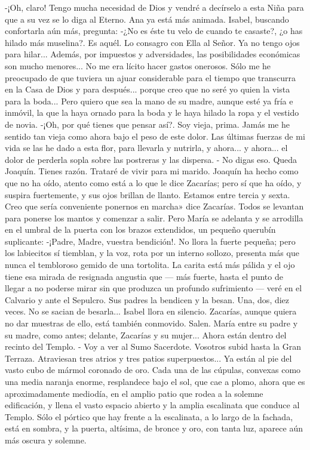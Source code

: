 \documentclass[12pt]{book} %
\begin{document}
-¡Oh, claro! Tengo mucha necesidad de Dios y vendré a decírselo a esta Niña para que a su vez se lo diga al Eterno. 
Ana ya está más animada. Isabel, buscando confortarla aún más, pregunta: 
-¿No es éste tu velo de cuando te casaste?, ¿o has hilado más muselina?. 
Es aquél. Lo consagro con Ella al Señor. Ya no tengo ojos para hilar... Además, por impuestos y adversidades, las posibilidades económicas son mucho menores... No me era lícito hacer gastos onerosos. Sólo me he preocupado de que tuviera un ajuar considerable para el tiempo que transcurra en la Casa de Dios y para después... porque creo que no seré yo quien la vista para la boda... Pero quiero que sea la mano de su madre, aunque esté ya fría e inmóvil, la que la haya ornado para la boda y le haya hilado la ropa y el vestido de novia. 
-¡Oh, por qué tienes que pensar así?. 
Soy vieja, prima. Jamás me he sentido tan vieja como ahora bajo el peso de este dolor. Las últimas fuerzas de mi vida 
se las he dado a esta flor, para llevarla y nutrirla, y ahora... y ahora... el dolor de perderla sopla sobre las postreras y las dispersa. - No digas eso. Queda Joaquín. 
Tienes razón. Trataré de vivir para mi marido. 
Joaquín ha hecho como que no ha oído, atento como está a lo que le dice Zacarías; pero sí que ha oído, y suspira 
fuertemente, y sus ojos brillan de llanto. 
Estamos entre tercia y sexta. Creo que sería conveniente ponernos en marcha» dice Zacarías. 
Todos se levantan para ponerse los mantos y comenzar a salir. 
Pero María se adelanta y se arrodilla en el umbral de la puerta con los brazos extendidos, un pequeño querubín 
suplicante: 
-¡Padre, Madre, vuestra bendición!. 
No llora la fuerte pequeña; pero los labiecitos sí tiemblan, y la voz, rota por un interno sollozo, presenta más que nunca el tembloroso gemido de una tortolita. La carita está más pálida y el ojo tiene esa mirada de resignada angustia que — más fuerte, hasta el punto de llegar a no poderse mirar sin que produzca un profundo sufrimiento — veré en el Calvario y ante el Sepulcro. 
Sus padres la bendicen y la besan. Una, dos, diez veces. No se sacian de besarla... Isabel llora en silencio. Zacarías, aunque quiera no dar muestras de ello, está también conmovido. 
Salen. María entre su padre y su madre, como antes; delante, Zacarías y su mujer... 
Ahora están dentro del recinto del Templo. 
- Voy a ver al Sumo Sacerdote. Vosotros subid hasta la Gran Terraza. 
Atraviesan tres atrios y tres patios superpuestos... Ya están al pie del vasto cubo de mármol coronado de oro. Cada una de las cúpulas, convexas como una media naranja enorme, resplandece bajo el sol, que cae a plomo, ahora que es aproximadamente mediodía, en el amplio patio que rodea a la solemne edificación, y llena el vasto espacio abierto y la amplia escalinata que conduce al Templo. Sólo el pórtico que hay frente a la escalinata, a lo largo de la fachada, está en sombra, y la puerta, altísima, de bronce y oro, con tanta luz, aparece aún más oscura y solemne. 
\end{document}
